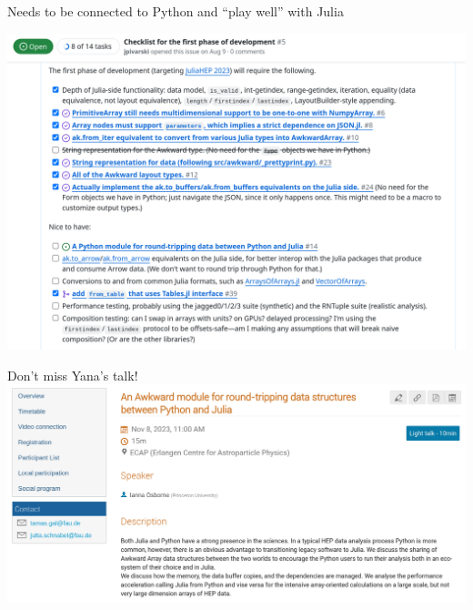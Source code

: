 \documentclass[aspectratio=169]{beamer}
\begin{document}
\begin{frame}{Needs to be connected to Python and ``play well'' with Julia}
\vspace{0.1 cm}
\begin{center}
\includegraphics[width=0.82\linewidth]{issue-5.png}
\end{center}
\end{frame}

\begin{frame}{Don't miss Yana's talk!}
\vspace{0.5 cm}
\includegraphics[width=\linewidth]{ianna-lightning-talk.png}
\end{frame}
\end{document}
